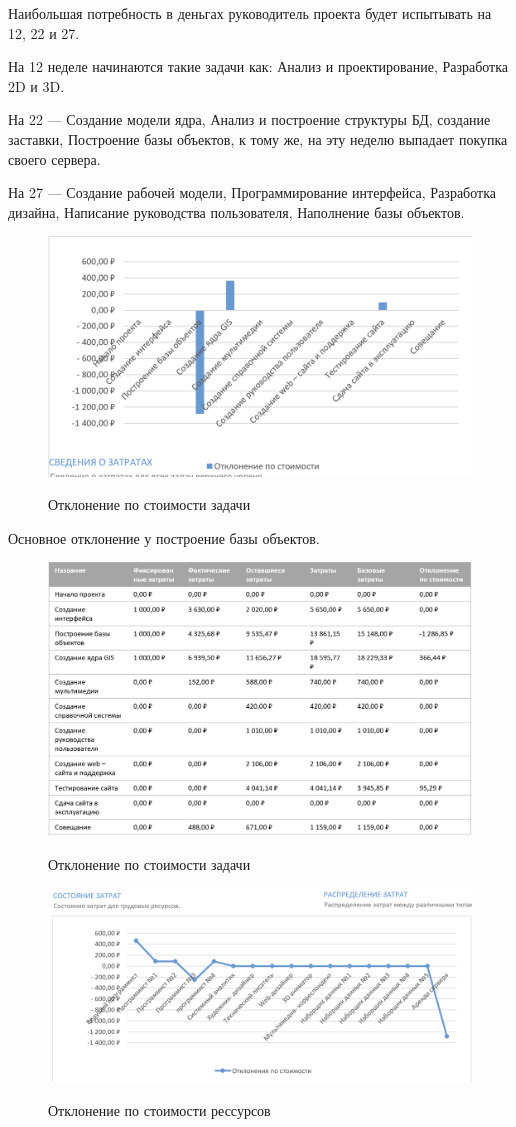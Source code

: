 Наибольшая потребность в деньгах руководитель проекта будет испытывать
на 12, 22 и 27.

На 12 неделе начинаются такие задачи как: Анализ и проектирование, Разработка 2D и 3D.

На 22 –-- Создание модели ядра, Анализ и построение структуры БД, создание
заставки, Построение базы объектов, к тому же, на эту неделю выпадает
покупка своего сервера.

На 27 --– Создание рабочей модели, Программирование интерфейса, Разработка
дизайна, Написание руководства пользователя, Наполнение базы объектов.

\begin{figure}[ht!]
	\includegraphics[width=0.75\linewidth]{assets/images/Screenshot 2024-03-16 at 12.57.15.png}
	\label{fig:r2}
	\caption{Отклонение по стоимости задачи}
\end{figure}
\FloatBarrier

Основное отклонение у построение базы объектов.

\begin{figure}[ht!]
	\includegraphics[width=0.75\linewidth]{assets/images/Screenshot 2024-03-16 at 12.58.51.png}
	\label{fig:r2}
	\caption{Отклонение по стоимости задачи}
\end{figure}
\FloatBarrier

\begin{figure}[ht!]
	\includegraphics[width=0.75\linewidth]{assets/images/Screenshot 2024-03-16 at 12.59.47.png}
	\label{fig:r2}
	\caption{Отклонение по стоимости рессурсов}
\end{figure}
\FloatBarrier

